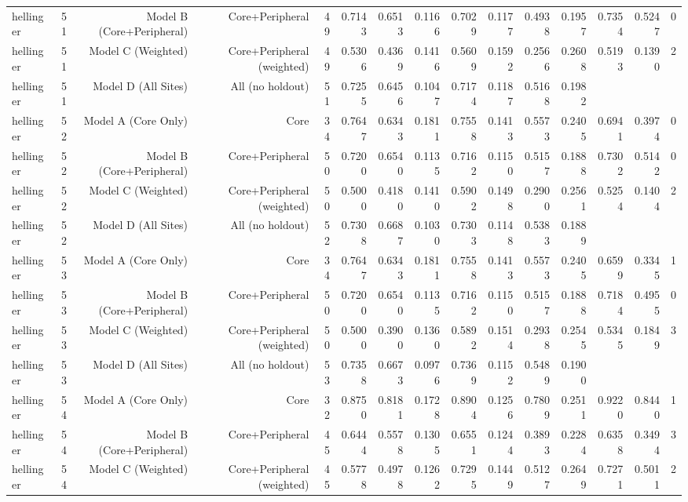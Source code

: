 {\begin{longtable}{lrrrrrrrrrrrrrr}
  hellinger & 51 & Model B (Core+Peripheral) & Core+Peripheral & 49 & 0.7143 & 0.6513 & 0.1166 & 0.7029 & 0.1177 & 0.4938 & 0.1957 & 0.7354 & 0.5247 & 0 \\
  hellinger & 51 & Model C (Weighted) & Core+Peripheral (weighted) & 49 & 0.5306 & 0.4369 & 0.1416 & 0.5609 & 0.1592 & 0.2566 & 0.2608 & 0.5193 & 0.1390 & 2 \\
  hellinger & 51 & Model D (All Sites) & All (no holdout) & 51 & 0.7255 & 0.6456 & 0.1047 & 0.7174 & 0.1187 & 0.5168 & 0.1982 &  &  &  \\
  hellinger & 52 & Model A (Core Only) & Core & 34 & 0.7647 & 0.6343 & 0.1811 & 0.7558 & 0.1413 & 0.5573 & 0.2405 & 0.6941 & 0.3974 & 0 \\
  hellinger & 52 & Model B (Core+Peripheral) & Core+Peripheral & 50 & 0.7200 & 0.6540 & 0.1135 & 0.7162 & 0.1150 & 0.5157 & 0.1888 & 0.7302 & 0.5142 & 0 \\
  hellinger & 52 & Model C (Weighted) & Core+Peripheral (weighted) & 50 & 0.5000 & 0.4180 & 0.1410 & 0.5902 & 0.1498 & 0.2900 & 0.2561 & 0.5254 & 0.1404 & 2 \\
  hellinger & 52 & Model D (All Sites) & All (no holdout) & 52 & 0.7308 & 0.6687 & 0.1030 & 0.7303 & 0.1148 & 0.5383 & 0.1889 &  &  &  \\
  hellinger & 53 & Model A (Core Only) & Core & 34 & 0.7647 & 0.6343 & 0.1811 & 0.7558 & 0.1413 & 0.5573 & 0.2405 & 0.6599 & 0.3345 & 1 \\
  hellinger & 53 & Model B (Core+Peripheral) & Core+Peripheral & 50 & 0.7200 & 0.6540 & 0.1135 & 0.7162 & 0.1150 & 0.5157 & 0.1888 & 0.7184 & 0.4955 & 0 \\
  hellinger & 53 & Model C (Weighted) & Core+Peripheral (weighted) & 50 & 0.5000 & 0.3900 & 0.1360 & 0.5892 & 0.1514 & 0.2938 & 0.2545 & 0.5345 & 0.1849 & 3 \\
  hellinger & 53 & Model D (All Sites) & All (no holdout) & 53 & 0.7358 & 0.6673 & 0.0976 & 0.7369 & 0.1152 & 0.5489 & 0.1900 &  &  &  \\
  hellinger & 54 & Model A (Core Only) & Core & 32 & 0.8750 & 0.8181 & 0.1728 & 0.8904 & 0.1256 & 0.7809 & 0.2511 & 0.9220 & 0.8440 & 1 \\
  hellinger & 54 & Model B (Core+Peripheral) & Core+Peripheral & 45 & 0.6444 & 0.5578 & 0.1305 & 0.6551 & 0.1244 & 0.3893 & 0.2284 & 0.6358 & 0.3494 & 3 \\
  hellinger & 54 & Model C (Weighted) & Core+Peripheral (weighted) & 45 & 0.5778 & 0.4978 & 0.1262 & 0.7295 & 0.1449 & 0.5127 & 0.2649 & 0.7271 & 0.5011 & 2 \\

\end{longtable}}
